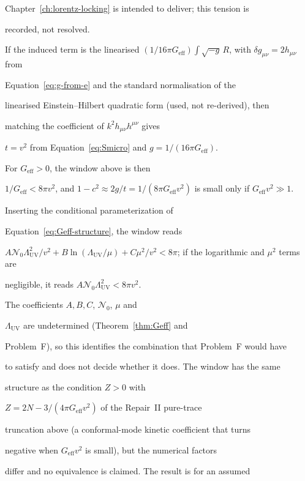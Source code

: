Chapter~\ref{ch:lorentz-locking} is intended to deliver; this tension is

recorded, not resolved.



If the induced term is the linearised \((1/16\pi G_{\mathrm{eff}})\int

\sqrt{-g}\,R\), with \(\delta g_{\mu\nu}=2h_{\mu\nu}\) from

Equation~\eqref{eq:g-from-e} and the standard normalisation of the

linearised Einstein--Hilbert quadratic form (used, not re-derived), then

matching the coefficient of \(k^2h_{\mu\nu}h^{\mu\nu}\) gives

\(t=v^2\) from Equation~\eqref{eq:Smicro} and \(g=1/(16\pi G_{\mathrm{eff}})\).

For \(G_{\mathrm{eff}}>0\), the window above is then

\(1/G_{\mathrm{eff}}<8\pi v^2\), and \(1-c^2\approx 2g/t=1/(8\pi

G_{\mathrm{eff}}v^2)\) is small only if \(G_{\mathrm{eff}}v^2\gg1\).

Inserting the conditional parameterization of

Equation~\eqref{eq:Geff-structure}, the window reads

\(A\mathcal N_0\Lambda_{\mathrm{UV}}^2/v^2+B\ln(\Lambda_{\mathrm{UV}}/\mu)

+C\mu^2/v^2<8\pi\); if the logarithmic and \(\mu^2\) terms are

negligible, it reads \(A\mathcal N_0\Lambda_{\mathrm{UV}}^2<8\pi v^2\).

The coefficients \(A,B,C\), \(\mathcal N_0\), \(\mu\) and

\(\Lambda_{\mathrm{UV}}\) are undetermined (Theorem~\ref{thm:Geff} and

Problem~F), so this identifies the combination that Problem~F would have

to satisfy and does not decide whether it does.  The window has the same

structure as the condition \(Z>0\) with

\(Z=2N-3/(4\pi G_{\mathrm{eff}}v^2)\) of the Repair~II pure-trace

truncation above (a conformal-mode kinetic coefficient that turns

negative when \(G_{\mathrm{eff}}v^2\) is small), but the numerical factors

differ and no equivalence is claimed.  The result is for an assumed

